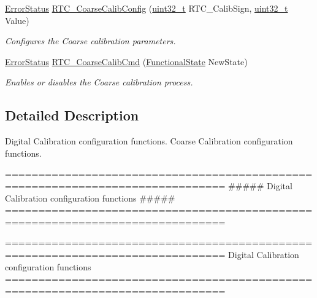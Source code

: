\begin{DoxyCompactItemize}
\hyperlink{group___exported__types_ga8333b96c67f83cba354b3407fcbb6ee8}{Error\-Status} \hyperlink{group___r_t_c___group7_gaa3bb10170a2c70ac9ce3e41c611bdd43}{R\-T\-C\-\_\-\-Coarse\-Calib\-Config} (\hyperlink{stdint_8h_a435d1572bf3f880d55459d9805097f62}{uint32\-\_\-t} R\-T\-C\-\_\-\-Calib\-Sign, \hyperlink{stdint_8h_a435d1572bf3f880d55459d9805097f62}{uint32\-\_\-t} Value)
\begin{DoxyCompactList}\small\item\em Configures the Coarse calibration parameters. \end{DoxyCompactList}\item 
\hyperlink{group___exported__types_ga8333b96c67f83cba354b3407fcbb6ee8}{Error\-Status} \hyperlink{group___r_t_c___group7_ga008ae7173b2befe876f5e76686bc9089}{R\-T\-C\-\_\-\-Coarse\-Calib\-Cmd} (\hyperlink{group___exported__types_gac9a7e9a35d2513ec15c3b537aaa4fba1}{Functional\-State} New\-State)
\begin{DoxyCompactList}\small\item\em Enables or disables the Coarse calibration process. \end{DoxyCompactList}\end{DoxyCompactItemize}


\subsection{Detailed Description}
Digital Calibration configuration functions. Coarse Calibration configuration functions.

\begin{DoxyVerb} ===============================================================================
            ##### Digital Calibration configuration functions #####
 ===============================================================================\end{DoxyVerb}


\begin{DoxyVerb} ===============================================================================
                  Digital Calibration configuration functions
 ===============================================================================  \end{DoxyVerb}
 

